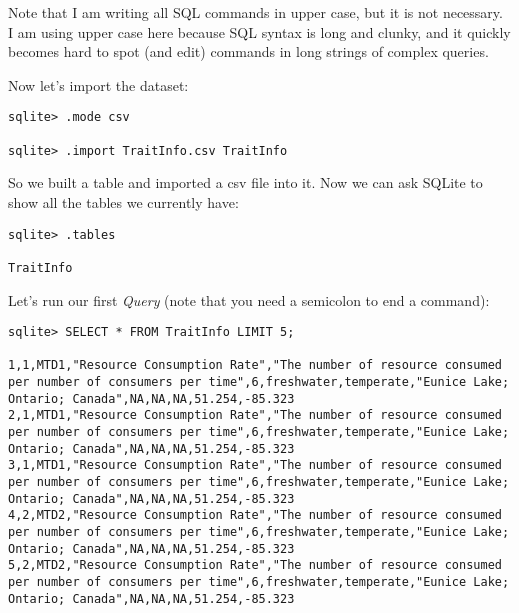 Note that I am writing all SQL commands in upper case, but it is not 
necessary. I am using upper case here because SQL syntax is long and 
clunky, and it quickly becomes hard to spot (and edit) commands in long 
strings of complex queries.     

Now let's import the dataset:

\begin{lstlisting}
sqlite> .mode csv

sqlite> .import TraitInfo.csv TraitInfo
\end{lstlisting}

So we built a table and imported a csv file into it. Now we can ask 
SQLite to show all the tables we currently have:

% 
% 

\begin{lstlisting}
sqlite> .tables

TraitInfo
\end{lstlisting}

Let's run our first {\it Query} (note that you need a semicolon to end 
a command):

\begin{lstlisting}
sqlite> SELECT * FROM TraitInfo LIMIT 5;

1,1,MTD1,"Resource Consumption Rate","The number of resource consumed per number of consumers per time",6,freshwater,temperate,"Eunice Lake; Ontario; Canada",NA,NA,NA,51.254,-85.323
2,1,MTD1,"Resource Consumption Rate","The number of resource consumed per number of consumers per time",6,freshwater,temperate,"Eunice Lake; Ontario; Canada",NA,NA,NA,51.254,-85.323
3,1,MTD1,"Resource Consumption Rate","The number of resource consumed per number of consumers per time",6,freshwater,temperate,"Eunice Lake; Ontario; Canada",NA,NA,NA,51.254,-85.323
4,2,MTD2,"Resource Consumption Rate","The number of resource consumed per number of consumers per time",6,freshwater,temperate,"Eunice Lake; Ontario; Canada",NA,NA,NA,51.254,-85.323
5,2,MTD2,"Resource Consumption Rate","The number of resource consumed per number of consumers per time",6,freshwater,temperate,"Eunice Lake; Ontario; Canada",NA,NA,NA,51.254,-85.323

\end{lstlisting}
  
